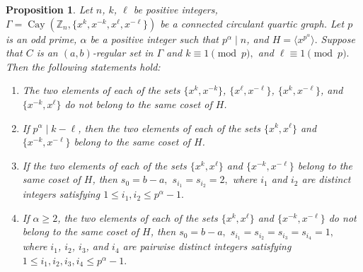 \documentclass[12pt]{article}
\newtheorem{prop}[formula]{Proposition}
\begin{document}
  \begin{prop}\label{prop:podd}
  	Let $n$, $k$, $\ell$ be positive integers,
  	$
  	\Gamma=\operatorname{Cay}(\mathbb{Z}_n,\{x^k,x^{-k},x^\ell,x^{-\ell}\})
  	$
  	be a connected circulant quartic graph. Let $p$ is an odd prime, $\alpha$ be a positive integer such that $p^\alpha\mid n$, and
  	$
  	H=\langle x^{p^\alpha}\rangle.
  	$
  	Suppose that $C$ is an $(a,b)$-regular set in $\Gamma$ and
  	$
  	k\equiv1\pmod p,$ and
  $\ell\equiv1\pmod p.
  	$
  	Then the following statements hold:
 	\begin{enumerate}
  	\item[(i)] The two elements of each of the sets $\{x^k,x^{-k}\}$, $\{x^\ell,x^{-\ell}\}$, $\{x^k,x^{-\ell}\}$, and $\{x^{-k},x^\ell\}$ do not belong to the same coset of $H$.
  	\item[(ii)] If $p^\alpha \mid k-\ell$, then the two elements of each of the sets $\{x^k,x^\ell\}$ and $\{x^{-k},x^{-\ell}\}$ belong to the same coset of $H$.
 	\item[(iii)] If the two elements of each of the sets $\{x^k,x^\ell\}$ and $\{x^{-k},x^{-\ell}\}$ belong to the same coset of $H$, then
 	$
 	s_0=b-a,$ $s_{i_1}=s_{i_2}=2,
 	$
 	where $i_1$ and $i_2$ are distinct integers satisfying
 	$
 	1\le i_1,i_2\le p^\alpha-1.
 	$
  	\item[(iv)] If $\alpha\geq 2$, the two elements of each of the sets $\{x^k,x^\ell\}$ and $\{x^{-k},x^{-\ell}\}$ do not belong to the same coset of $H$, then
  	$
  	s_0=b-a,$ $ s_{i_1}=s_{i_2}=s_{i_3}=s_{i_4}=1,$
  	where $i_1$, $i_2$, $i_3$, and $i_4$ are pairwise distinct integers satisfying
  	$
  	1\le i_1,i_2,i_3,i_4\le p^\alpha-1.
  	$
  	\end{enumerate}
  \end{prop}
\end{document}
